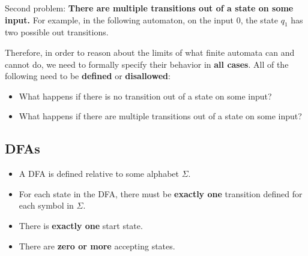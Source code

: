 \documentclass[12pt, letterpaper, oneside]{book}
\begin{document}

Second problem: \textbf{There are multiple transitions out of a state on some input.} For example, in the following
automaton, on the input $0$, the state $q_1$ has two possible out transitions.


Therefore, in order to reason about the limits of what finite automata can and cannot do, we need to formally specify
their behavior in \textbf{all cases}. All of the following need to be \textbf{defined} or \textbf{disallowed}:
\begin{itemize}
  \item What happens if there is no transition out of a state on some input?
  \item What happens if there are multiple transitions out of a state on some input?
\end{itemize}

\subsection{DFAs}

\begin{itemize}
  \item A DFA is defined relative to some alphabet $\Sigma$.
  \item For each state in the DFA, there must be \textbf{exactly one} transition defined for each symbol in $\Sigma$.
  \item There is \textbf{exactly one} start state.
  \item There are \textbf{zero or more} accepting states.
\end{itemize}
\end{document}
